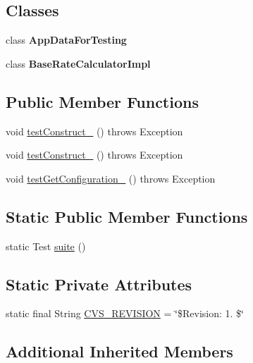 \subsection*{Classes}
\begin{DoxyCompactItemize}
\item 
class {\bfseries App\-Data\-For\-Testing}
\item 
class {\bfseries Base\-Rate\-Calculator\-Impl}
\end{DoxyCompactItemize}
\subsection*{Public Member Functions}
\begin{DoxyCompactItemize}
\item 
void \hyperlink{classorg_1_1jgap_1_1_base_rate_calculator_test_aa8d51a305ff11ab889759451399d8e09}{test\-Construct\-\_} ()  throws Exception 
\item 
void \hyperlink{classorg_1_1jgap_1_1_base_rate_calculator_test_a52cc372b82a04fc9b175e9c6af1454e5}{test\-Construct\-\_} ()  throws Exception 
\item 
void \hyperlink{classorg_1_1jgap_1_1_base_rate_calculator_test_a1d5ecacf681bfadcb38d2a3f6a0bb770}{test\-Get\-Configuration\-\_} ()  throws Exception 
\end{DoxyCompactItemize}
\subsection*{Static Public Member Functions}
\begin{DoxyCompactItemize}
\item 
static Test \hyperlink{classorg_1_1jgap_1_1_base_rate_calculator_test_a5c799561753098eb7ca58f71a57c87f8}{suite} ()
\end{DoxyCompactItemize}
\subsection*{Static Private Attributes}
\begin{DoxyCompactItemize}
\item 
static final String \hyperlink{classorg_1_1jgap_1_1_base_rate_calculator_test_adcd369bbbf536ed1839b8475a633d9ea}{C\-V\-S\-\_\-\-R\-E\-V\-I\-S\-I\-O\-N} = \char`\"{}\$Revision\-: 1. \$\char`\"{}
\end{DoxyCompactItemize}
\subsection*{Additional Inherited Members}


